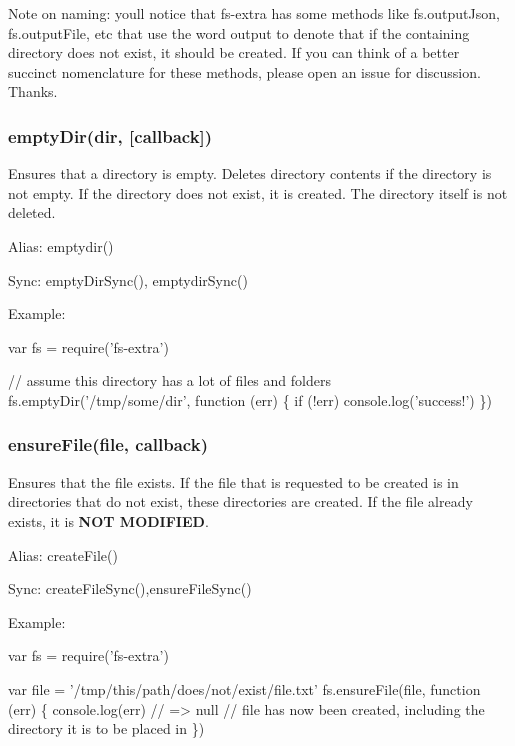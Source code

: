 Note on naming\+: you\textquotesingle{}ll notice that fs-\/extra has some methods like {\ttfamily fs.\+output\+Json}, {\ttfamily fs.\+output\+File}, etc that use the word {\ttfamily output} to denote that if the containing directory does not exist, it should be created. If you can think of a better succinct nomenclature for these methods, please open an issue for discussion. Thanks.

\subsubsection*{empty\+Dir(dir, \mbox{[}callback\mbox{]})}

Ensures that a directory is empty. Deletes directory contents if the directory is not empty. If the directory does not exist, it is created. The directory itself is not deleted.

Alias\+: {\ttfamily emptydir()}

Sync\+: {\ttfamily empty\+Dir\+Sync()}, {\ttfamily emptydir\+Sync()}

Example\+:


\begin{DoxyCode}
var fs = require('fs-extra')

// assume this directory has a lot of files and folders
fs.emptyDir('/tmp/some/dir', function (err) \{
  if (!err) console.log('success!')
\})
\end{DoxyCode}


\subsubsection*{ensure\+File(file, callback)}

Ensures that the file exists. If the file that is requested to be created is in directories that do not exist, these directories are created. If the file already exists, it is {\bfseries N\+OT M\+O\+D\+I\+F\+I\+ED}.

Alias\+: {\ttfamily create\+File()}

Sync\+: {\ttfamily create\+File\+Sync()},{\ttfamily ensure\+File\+Sync()}

Example\+:


\begin{DoxyCode}
var fs = require('fs-extra')

var file = '/tmp/this/path/does/not/exist/file.txt'
fs.ensureFile(file, function (err) \{
  console.log(err) // => null
  // file has now been created, including the directory it is to be placed in
\})
\end{DoxyCode}



